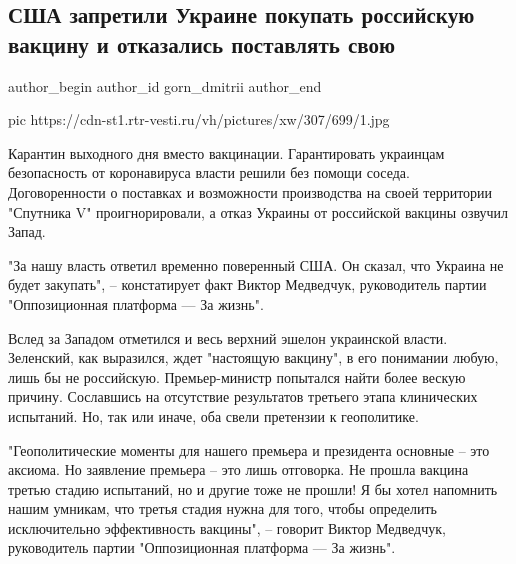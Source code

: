  
 
 
 
 
 
\subsection{США запретили Украине покупать российскую вакцину и отказались поставлять свою}
\label{sec:11_12_2020.news.ru.vesti.gorn_dmitrii.1.medvedchuk_vaccine}
\ifcmt
	author_begin
   author_id gorn_dmitrii
	author_end
\fi


\ifcmt
pic https://cdn-st1.rtr-vesti.ru/vh/pictures/xw/307/699/1.jpg
\fi


Карантин выходного дня вместо вакцинации. Гарантировать украинцам безопасность
от коронавируса власти решили без помощи соседа. Договоренности о поставках и
возможности производства на своей территории "Спутника V" проигнорировали, а
отказ Украины от российской вакцины озвучил Запад.

"За нашу власть ответил временно поверенный США. Он сказал, что Украина не
будет закупать", – констатирует факт Виктор Медведчук, руководитель партии
"Оппозиционная платформа — За жизнь".

Вслед за Западом отметился и весь верхний эшелон украинской власти. Зеленский,
как выразился, ждет "настоящую вакцину", в его понимании любую, лишь бы не
российскую. Премьер-министр попытался найти более вескую причину. Сославшись на
отсутствие результатов третьего этапа клинических испытаний. Но, так или иначе,
оба свели претензии к геополитике.

"Геополитические моменты для нашего премьера и президента основные – это
аксиома. Но заявление премьера – это лишь отговорка. Не прошла вакцина третью
стадию испытаний, но и другие тоже не прошли! Я бы хотел напомнить нашим
умникам, что третья стадия нужна для того, чтобы определить исключительно
эффективность вакцины", – говорит Виктор Медведчук, руководитель партии
"Оппозиционная платформа — За жизнь".


